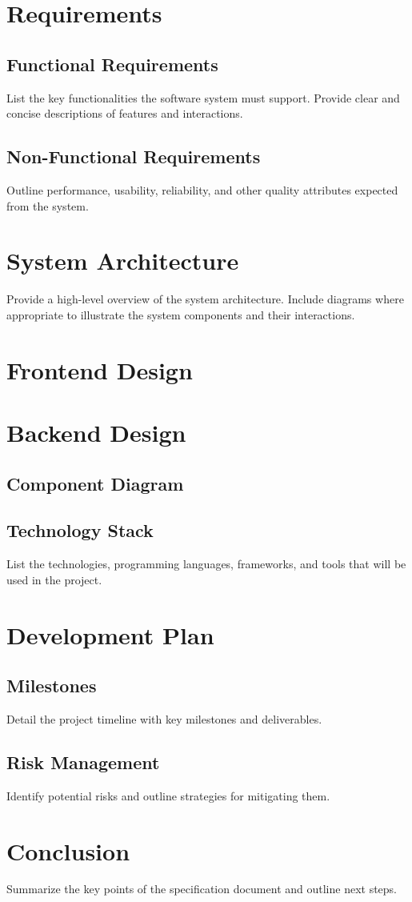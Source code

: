 \documentclass[12pt]{article}
\begin{document}
\section{Requirements}
\subsection{Functional Requirements}
List the key functionalities the software system must support. Provide clear and concise descriptions of features and interactions.

\subsection{Non-Functional Requirements}
Outline performance, usability, reliability, and other quality attributes expected from the system.

\section{System Architecture}
Provide a high-level overview of the system architecture. Include diagrams where appropriate to illustrate the system components and their interactions.

\section{Frontend Design}

\section{Backend Design}

\subsection{Component Diagram}
\begin{center}
\end{center}

\subsection{Technology Stack}
List the technologies, programming languages, frameworks, and tools that will be used in the project.

\section{Development Plan}
\subsection{Milestones}
Detail the project timeline with key milestones and deliverables.

\subsection{Risk Management}
Identify potential risks and outline strategies for mitigating them.

\section{Conclusion}
Summarize the key points of the specification document and outline next steps.
\end{document}
